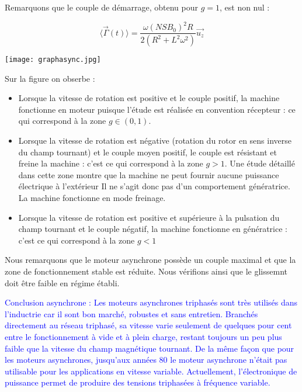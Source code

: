 \documentclass[12pt,prb,aps,epsf]{article}
\begin{document}
Remarquons que le couple de démarrage, obtenu pour $g=1$, est non nul :

\begin{equation}
    \langle \vec{\Gamma}(t) \rangle = \frac{\omega (NSB_0)^2R}{2(R^2 + L^2\omega^2)}\vec{u_z}
\end{equation}


\begin{center}
    \texttt{[image: graphasync.jpg]}
\end{center}



Sur la figure on obserbe :

\begin{itemize}
    \item Lorsque la vitesse de rotation est positive et le couple positif, la machine fonctionne en moteur puisque l'étude est réalisée en convention récepteur : ce qui correspond à la zone $g \in (0,1)$.
    \item Lorsque la vitesse de rotation est négative (rotation du rotor en sens inverse du champ tournant) et le couple moyen positif, le couple est résistant et freine la machine : c'est ce qui correspond à la zone $g > 1$. Une étude détaillé dans cette zone montre que la machine ne peut fournir aucune puissance électrique à l'extérieur Il ne s'agit donc pas d'un comportement génératrice. La machine fonctionne en mode freinage.
    \item Lorsque la vitesse de rotation est positive et supérieure à la pulsation du champ tournant et le couple négatif, la machine fonctionne en génératrice : c'est ce qui correspond à la zone $g<1$
\end{itemize}

Nous remarquons que le moteur asynchrone possède un couple maximal et que la zone de fonctionnement stable est réduite. Nous vérifions ainsi que le glissemnt doit être faible en régime établi.\medskip


\textcolor{blue}{Conclusion asynchrone : Les moteurs asynchrones triphasés sont très utilisés dans l'inductrie car il sont bon marché, robustes et sans entretien. Branchés directement au réseau triphasé, sa vitesse varie seulement de quelques pour cent entre le fonctionnement à vide et à plein charge, restant toujours un peu plus faible que la vitesse du champ magnétique tournant. De la même façon que pour les moteurs asynchrones, jusqu'aux années 80 le moteur asynchrone n'était pas utilisable pour les applications en vitesse variable. Actuellement, l'électronique de puissance permet de produire des tensions triphasées à fréquence variable.}
\end{document}
